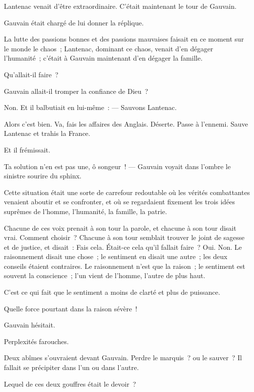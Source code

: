\documentclass[french,twoside]{book} %
\begin{document}
Lantenac venait d’être extraordinaire. C’était maintenant le tour de Gauvain.\par
Gauvain était chargé de lui donner la réplique.\par
La lutte des passions bonnes et des passions mauvaises faisait en ce moment sur le monde le chaos ; Lantenac, dominant ce chaos, venait d’en dégager l’humanité ; c’était à Gauvain maintenant d’en dégager la famille.\par
Qu’allait-il faire ?\par
Gauvain allait-il tromper la confiance de Dieu ?\par
Non. Et il balbutiait en lui-même : — Sauvons Lantenac.\par
Alors c’est bien. Va, fais les affaires des Anglais. Déserte. Passe à l’ennemi. Sauve Lantenac et trahis la France.\par
 Et il frémissait.\par
Ta solution n’en est pas une, ô songeur ! — Gauvain voyait dans l’ombre le sinistre sourire du sphinx.\par
Cette situation était une sorte de carrefour redoutable où les vérités combattantes venaient aboutir et se confronter, et où se regardaient fixement les trois idées suprêmes de l’homme, l’humanité, la famille, la patrie.\par
Chacune de ces voix prenait à son tour la parole, et chacune à son tour disait vrai. Comment choisir ? Chacune à son tour semblait trouver le joint de sagesse et de justice, et disait : Fais cela. Était-ce cela qu’il fallait faire ? Oui. Non. Le raisonnement disait une chose ; le sentiment en disait une autre ; les deux conseils étaient contraires. Le raisonnement n’est que la raison ; le sentiment est souvent la conscience ; l’un vient de l’homme, l’autre de plus haut.\par
C’est ce qui fait que le sentiment a moins de clarté et plus de puissance.\par
Quelle force pourtant dans la raison sévère !\par
Gauvain hésitait.\par
Perplexités farouches.\par
Deux abîmes s’ouvraient devant Gauvain. Perdre le marquis ? ou le sauver ? Il fallait se précipiter dans l’un ou dans l’autre.\par
Lequel de ces deux gouffres était le devoir ?
\end{document}
